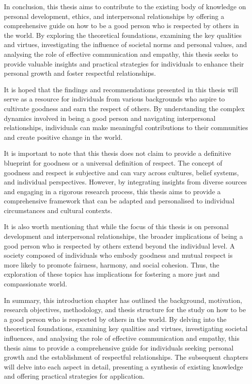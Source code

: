 In conclusion, this thesis aims to contribute to the existing body of knowledge on personal development, ethics, and interpersonal relationships by offering a comprehensive guide on how to be a good person who is respected by others in the world. By exploring the theoretical foundations, examining the key qualities and virtues, investigating the influence of societal norms and personal values, and analysing the role of effective communication and empathy, this thesis seeks to provide valuable insights and practical strategies for individuals to enhance their personal growth and foster respectful relationships.

It is hoped that the findings and recommendations presented in this thesis will serve as a resource for individuals from various backgrounds who aspire to cultivate goodness and earn the respect of others. By understanding the complex dynamics involved in being a good person and navigating interpersonal relationships, individuals can make meaningful contributions to their communities and create positive change in the world.

It is important to note that this thesis does not claim to provide a definitive blueprint for goodness or a universal definition of respect. The concept of goodness and respect is subjective and can vary across cultures, belief systems, and individual perspectives. However, by integrating insights from diverse sources and engaging in a rigorous research process, this thesis aims to provide a comprehensive framework that can be adapted and personalised to individual circumstances and cultural contexts.

It is also worth mentioning that while the focus of this thesis is on personal development and interpersonal relationships, the broader implications of being a good person who is respected by others extend beyond the individual level. A society composed of individuals who embody goodness and mutual respect is more likely to promote fairness, harmony, and social cohesion. Thus, the exploration of these topics has implications for fostering a more just and compassionate world.

In summary, this introduction chapter has outlined the background, motivation, research objectives, methodology, and thesis structure for the study on how to be a good person who is respected by others in the world. By delving into the theoretical foundations, examining key qualities and virtues, investigating societal influences, and analysing the role of effective communication and empathy, this thesis aims to provide a comprehensive guide for individuals seeking personal growth and the establishment of respectful relationships. The subsequent chapters will delve into each aspect in detail, presenting a synthesis of existing knowledge and offering practical strategies for application.

